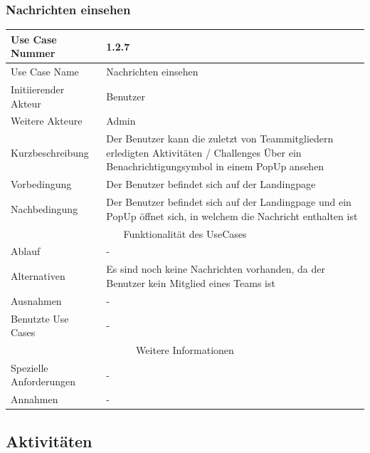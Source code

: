 \documentclass[10pt,a4paper]{article}
\begin{document}
		\subsubsection{Nachrichten einsehen}
		\begin{tabular}{|l|p{.5\linewidth}|}
			\hline Use Case Nummer & 1.2.7 \\ 
			\hline Use Case Name & Nachrichten einsehen \\ 
			\hline Initiierender Akteur & Benutzer \\
			\hline Weitere Akteure & Admin \\
			\hline Kurzbeschreibung & Der Benutzer kann die zuletzt von Teammitgliedern erledigten Aktivitäten / Challenges Über ein Benachrichtigungsymbol in einem PopUp ansehen \\
			\hline Vorbedingung & Der Benutzer befindet sich auf der Landingpage \\
			\hline Nachbedingung & Der Benutzer befindet sich auf der Landingpage und ein PopUp öffnet sich, in welchem die Nachricht enthalten ist \\ %
			\hline \multicolumn{2}{|c|}{Funktionalität des UseCases}\\
			\hline Ablauf & - \\
			\hline Alternativen & Es sind noch keine Nachrichten vorhanden, da der Benutzer kein Mitglied eines Teams ist \\
			\hline Ausnahmen & - \\
			\hline Benutzte Use Cases & - \\
			\hline \multicolumn{2}{|c|}{Weitere Informationen} \\
			\hline Spezielle Anforderungen & - \\
			\hline Annahmen & - \\
			\hline
		\end{tabular}
\subsection{Aktivit\"aten}
\end{document}
